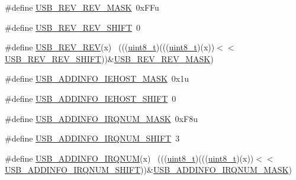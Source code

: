 \begin{DoxyCompactItemize}
\item 
\#define \hyperlink{group___u_s_b___register___masks_ga72a356a066674e41e3827b0ccb931e71}{U\+S\+B\+\_\+\+R\+E\+V\+\_\+\+R\+E\+V\+\_\+\+M\+A\+SK}~0x\+F\+Fu
\item 
\#define \hyperlink{group___u_s_b___register___masks_gab058ebe4be52454e46ef15ce015ac5fd}{U\+S\+B\+\_\+\+R\+E\+V\+\_\+\+R\+E\+V\+\_\+\+S\+H\+I\+FT}~0
\item 
\#define \hyperlink{group___u_s_b___register___masks_ga07d0c26b6db6e64d946e60bbd8879db0}{U\+S\+B\+\_\+\+R\+E\+V\+\_\+\+R\+EV}(x)                                                  ~(((\hyperlink{_p_e___types_8h_aba7bc1797add20fe3efdf37ced1182c5}{uint8\+\_\+t})(((\hyperlink{_p_e___types_8h_aba7bc1797add20fe3efdf37ced1182c5}{uint8\+\_\+t})(x))$<$$<$\hyperlink{group___u_s_b___register___masks_gab058ebe4be52454e46ef15ce015ac5fd}{U\+S\+B\+\_\+\+R\+E\+V\+\_\+\+R\+E\+V\+\_\+\+S\+H\+I\+FT}))\&\hyperlink{group___u_s_b___register___masks_ga72a356a066674e41e3827b0ccb931e71}{U\+S\+B\+\_\+\+R\+E\+V\+\_\+\+R\+E\+V\+\_\+\+M\+A\+SK})
\item 
\#define \hyperlink{group___u_s_b___register___masks_gacb7c792034c73c4861bc8fba6ff4314f}{U\+S\+B\+\_\+\+A\+D\+D\+I\+N\+F\+O\+\_\+\+I\+E\+H\+O\+S\+T\+\_\+\+M\+A\+SK}~0x1u
\item 
\#define \hyperlink{group___u_s_b___register___masks_gad256dcdfe8443877169b69dbcc8a041e}{U\+S\+B\+\_\+\+A\+D\+D\+I\+N\+F\+O\+\_\+\+I\+E\+H\+O\+S\+T\+\_\+\+S\+H\+I\+FT}~0
\item 
\#define \hyperlink{group___u_s_b___register___masks_gaa578584bfaf89e26213e6ba12e5f4b0e}{U\+S\+B\+\_\+\+A\+D\+D\+I\+N\+F\+O\+\_\+\+I\+R\+Q\+N\+U\+M\+\_\+\+M\+A\+SK}~0x\+F8u
\item 
\#define \hyperlink{group___u_s_b___register___masks_ga3332243caa9e2f9cfc49b031ac54cbda}{U\+S\+B\+\_\+\+A\+D\+D\+I\+N\+F\+O\+\_\+\+I\+R\+Q\+N\+U\+M\+\_\+\+S\+H\+I\+FT}~3
\item 
\#define \hyperlink{group___u_s_b___register___masks_ga1af2106db3477ecccb2d3b1c627c6da1}{U\+S\+B\+\_\+\+A\+D\+D\+I\+N\+F\+O\+\_\+\+I\+R\+Q\+N\+UM}(x)                                    ~(((\hyperlink{_p_e___types_8h_aba7bc1797add20fe3efdf37ced1182c5}{uint8\+\_\+t})(((\hyperlink{_p_e___types_8h_aba7bc1797add20fe3efdf37ced1182c5}{uint8\+\_\+t})(x))$<$$<$\hyperlink{group___u_s_b___register___masks_ga3332243caa9e2f9cfc49b031ac54cbda}{U\+S\+B\+\_\+\+A\+D\+D\+I\+N\+F\+O\+\_\+\+I\+R\+Q\+N\+U\+M\+\_\+\+S\+H\+I\+FT}))\&\hyperlink{group___u_s_b___register___masks_gaa578584bfaf89e26213e6ba12e5f4b0e}{U\+S\+B\+\_\+\+A\+D\+D\+I\+N\+F\+O\+\_\+\+I\+R\+Q\+N\+U\+M\+\_\+\+M\+A\+SK})

\end{DoxyCompactItemize}
